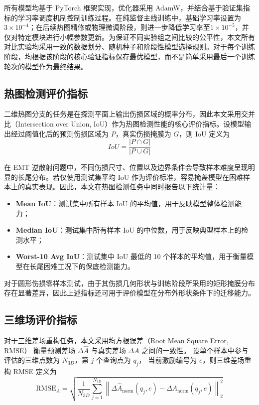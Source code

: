 所有模型均基于 PyTorch 框架实现，优化器采用 AdamW，并结合基于验证集指标的学习率调度机制控制训练过程\citep{loshchilov2017decoupled}。在纯监督主线训练中，基础学习率设置为 $3\times10^{-4}$；在后续热图精修或物理微调阶段，则进一步降低学习率至$1\times10^{-5}$，并仅对特定模块进行小幅参数更新。为保证不同实验组之间比较的公平性，本文所有对比实验均采用一致的数据划分、随机种子和阶段性模型选择规则。对于每个训练阶段，均根据该阶段的核心验证指标保存最优模型，而不是简单采用最后一个训练轮次的模型作为最终结果。

\subsection{热图检测评价指标}
\label{subsec:heatmap_metrics}

二维热图分支的任务是在探测平面上输出伤损区域的概率分布，因此本文采用交并比（Intersection over Union, IoU）作为热图检测性能的核心评价指标。设模型输出经过阈值化后的预测伤损区域为 $P$，真实伤损掩膜为 $G$，则 IoU 定义为
\begin{equation}
\label{eq:iou_definition}
IoU=\frac{|P\cap G|}{|P\cup G|}
\end{equation}

在 EMT 逆散射问题中，不同伤损尺寸、位置以及边界条件会导致样本难度呈现明显的长尾分布。若仅使用测试集平均 IoU 作为评价标准，容易掩盖模型在困难样本上的真实表现。因此，本文在热图检测任务中同时报告以下统计量：

\begin{itemize}
    \item \textbf{Mean IoU}：测试集中所有样本 IoU 的平均值，用于反映模型整体检测能力；
    \item \textbf{Median IoU}：测试集中所有样本 IoU 的中位数，用于反映典型样本上的检测水平；
    \item \textbf{Worst-10 Avg IoU}：测试集中 IoU 最低的 10 个样本的平均值，用于衡量模型在长尾困难工况下的保底检测能力。
\end{itemize}

对于圆形伤损零样本测试，由于其伤损几何形状与训练阶段所采用的矩形掩膜分布存在显著差异，因此上述指标还可用于评价模型在分布外形状条件下的迁移能力。

\subsection{三维场评价指标}
\label{subsec:field_metrics}

对于三维差场重构任务，本文采用均方根误差（Root Mean Square Error, RMSE）
衡量预测差场 $\Delta \hat{A}$ 与真实差场 $\Delta A$ 之间的一致性。
设单个样本中参与评估的三维点数为 $N_{3D}$，第 $j$ 个查询点为 $q_j$，
当前激励编号为 $e$，则三维差场重构 RMSE 定义为
\begin{equation}
\label{eq:rmse_A}
\mathrm{RMSE}_{A}
=
\sqrt{
\frac{1}{N_{3D}}
\sum_{j=1}^{N_{3D}}
\left\|
\Delta \hat{A}_{\mathrm{norm}}(q_j,e)
-
\Delta A_{\mathrm{norm}}(q_j,e)
\right\|_2^2
}
\end{equation}

